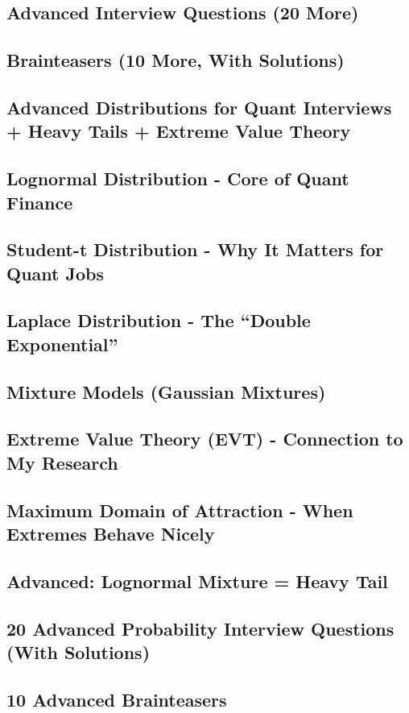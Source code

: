 \documentclass{report}
\begin{document}
\subsection*{Advanced Interview Questions (20 More)}
\subsection*{Brainteasers (10 More, With Solutions)}


\subsection*{Advanced Distributions for Quant Interviews + Heavy Tails + Extreme Value Theory}

\subsection*{Lognormal Distribution - Core of Quant Finance}
\subsection*{Student-t Distribution - Why It Matters for Quant Jobs}
\subsection*{Laplace Distribution - The “Double Exponential”}
\subsection*{Mixture Models (Gaussian Mixtures)}
\subsection*{Extreme Value Theory (EVT) - Connection to My Research}
\subsection*{Maximum Domain of Attraction - When Extremes Behave Nicely}
\subsection*{Advanced: Lognormal Mixture = Heavy Tail}
\subsection*{20 Advanced Probability Interview Questions (With Solutions)}
\subsection*{10 Advanced Brainteasers}
\end{document}
